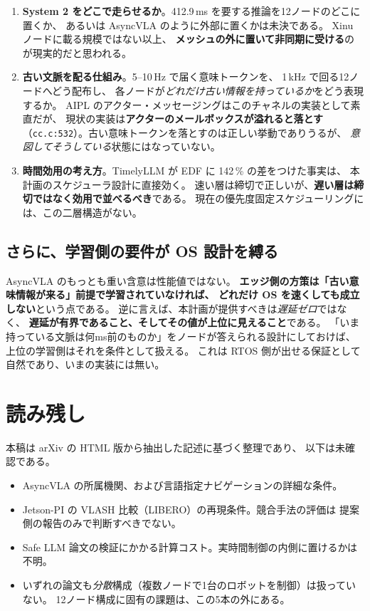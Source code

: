 \documentclass[11pt,a4paper]{article}
\newcommand{\code}[1]{\texttt{#1}}
\newcommand{\prob}[1]{\textbf{\textcolor{red!55!black}{#1}}}
\newcommand{\keyp}[1]{\textbf{\textcolor{blue!45!black}{#1}}}
\begin{document}
\begin{enumerate}[leftmargin=1.6em,itemsep=3pt]
  \item \prob{System 2 をどこで走らせるか}。412.9\,ms を要する推論を12ノードのどこに置くか、
        あるいは AsyncVLA のように外部に置くかは未決である。
        Xinu ノードに載る規模ではない以上、
        \keyp{メッシュの外に置いて非同期に受ける}のが現実的だと思われる。
  \item \prob{古い文脈を配る仕組み}。5--10\,Hz で届く意味トークンを、
        1\,kHz で回る12ノードへどう配布し、
        各ノードが\emph{どれだけ古い情報を持っているか}をどう表現するか。
        AIPL のアクター・メッセージングはこのチャネルの実装として素直だが、
        現状の実装は\prob{アクターのメールボックスが溢れると落とす}
        （\code{cc.c:532}）。古い意味トークンを落とすのは正しい挙動でありうるが、
        \emph{意図してそうしている}状態にはなっていない。
  \item \prob{時間効用の考え方}。TimelyLLM が EDF に 142\,\% の差をつけた事実は、
        本計画のスケジューラ設計に直接効く。
        速い層は締切で正しいが、\keyp{遅い層は締切ではなく効用で並べるべき}である。
        現在の優先度固定スケジューリングには、この二層構造がない。
\end{enumerate}

\subsection*{さらに、学習側の要件が OS 設計を縛る}

AsyncVLA のもっとも重い含意は性能値ではない。
\prob{エッジ側の方策は「古い意味情報が来る」前提で学習されていなければ、
どれだけ OS を速くしても成立しない}という点である。
逆に言えば、本計画が提供すべきは\emph{遅延ゼロ}ではなく、
\keyp{遅延が有界であること、そしてその値が上位に見えること}である。
「いま持っている文脈は何ms前のものか」をノードが答えられる設計にしておけば、
上位の学習側はそれを条件として扱える。
これは RTOS 側が出せる保証として自然であり、いまの実装には無い。

\section{読み残し}

本稿は arXiv の HTML 版から抽出した記述に基づく整理であり、
以下は未確認である。

\begin{itemize}[leftmargin=1.4em,itemsep=2pt]
  \item AsyncVLA の所属機関、および言語指定ナビゲーションの詳細な条件。
  \item Jetson-PI の VLASH 比較（LIBERO）の再現条件。競合手法の評価は
        提案側の報告のみで判断すべきでない。
  \item Safe LLM 論文の検証にかかる計算コスト。実時間制御の内側に置けるかは不明。
  \item いずれの論文も\emph{分散}構成（複数ノードで1台のロボットを制御）は扱っていない。
        12ノード構成に固有の課題は、この5本の外にある。
\end{itemize}
\end{document}
